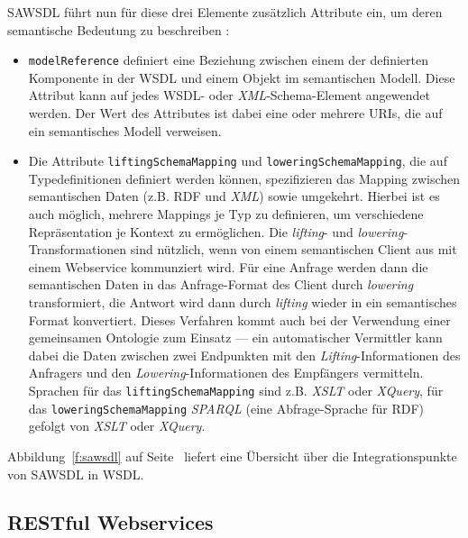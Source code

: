 \ac{SAWSDL} führt nun für diese drei Elemente zusätzlich Attribute ein, um deren semantische Bedeutung zu beschreiben \cite[S.62ff]{ky-sawsdl}:

\begin{itemize}
\item \texttt{modelReference} definiert eine Beziehung zwischen einem der definierten Komponente in der \ac{WSDL} und einem Objekt im semantischen Modell. Diese Attribut kann auf jedes \ac{WSDL}- oder \emph{XML}-Schema-Element angewendet werden. Der Wert des Attributes ist dabei eine oder mehrere URIs, die auf ein semantisches Modell verweisen.
\item Die Attribute \texttt{liftingSchemaMapping} und \texttt{loweringSchemaMapping}, die auf Typedefinitionen definiert werden können, spezifizieren das Mapping zwischen semantischen Daten (z.B. \ac{RDF} und \emph{XML}) sowie umgekehrt. Hierbei ist es auch möglich, mehrere Mappings je Typ zu definieren, um verschiedene Repräsentation je Kontext zu ermöglichen. Die \emph{lifting}- und \emph{lowering}-Transformationen sind nützlich, wenn von einem semantischen Client aus mit einem Webservice kommunziert wird. Für eine Anfrage werden dann die semantischen Daten in das Anfrage-Format des Client durch \emph{lowering} transformiert, die Antwort wird dann durch \emph{lifting} wieder in ein semantisches Format konvertiert. Dieses Verfahren kommt auch bei der Verwendung einer gemeinsamen Ontologie zum Einsatz --- ein automatischer Vermittler kann dabei die Daten zwischen zwei Endpunkten mit den \emph{Lifting}-Informationen des Anfragers und den \emph{Lowering}-Informationen des Empfängers vermitteln. Sprachen für das \texttt{liftingSchemaMapping} sind z.B. \emph{XSLT} oder \emph{XQuery}, für das \texttt{loweringSchemaMapping} \emph{SPARQL} (eine Abfrage-Sprache für \ac{RDF}) gefolgt von \emph{XSLT} oder \emph{XQuery}.
\end{itemize}

Abbildung~\ref{f:sawsdl} auf Seite~\pageref{f:sawsdl} liefert eine Übersicht über die Integrationspunkte von \ac{SAWSDL} in \ac{WSDL}.

\subsection{RESTful Webservices}

